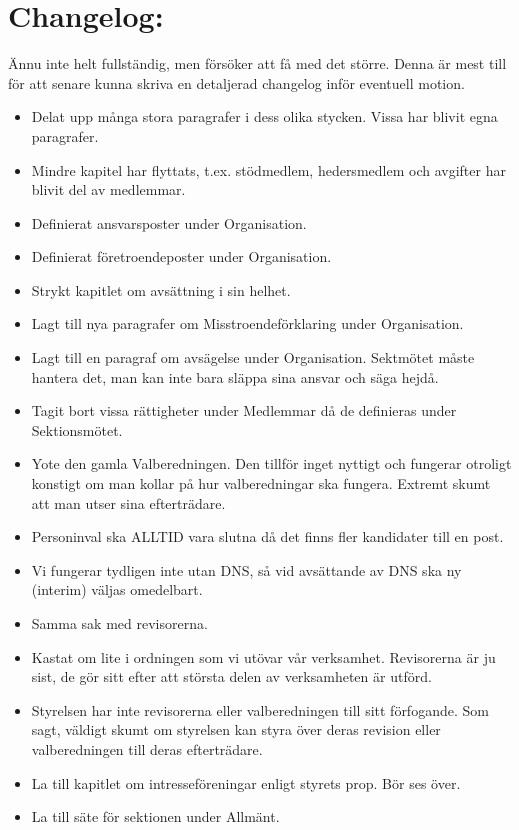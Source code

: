 \documentclass[a4paper]{dteklag}
\begin{document}
\section{Changelog:}
Ännu inte helt fullständig, men försöker att få med det större. Denna är mest till för att senare kunna skriva en detaljerad changelog inför eventuell motion.
\begin{itemize}
  \item Delat upp många stora paragrafer i dess olika stycken. Vissa har blivit egna paragrafer.
  \item Mindre kapitel har flyttats, t.ex. stödmedlem, hedersmedlem och avgifter har blivit del av medlemmar.
  \item Definierat ansvarsposter under Organisation.
  \item Definierat företroendeposter under Organisation.
  \item Strykt kapitlet om avsättning i sin helhet.
  \item Lagt till nya paragrafer om Misstroendeförklaring under Organisation.
  \item Lagt till en paragraf om avsägelse under Organisation. Sektmötet måste hantera det, man kan inte bara släppa sina ansvar och säga hejdå.
  \item Tagit bort vissa rättigheter under Medlemmar då de definieras under Sektionsmötet.
  \item Yote den gamla Valberedningen. Den tillför inget nyttigt och fungerar otroligt konstigt om man kollar på hur valberedningar ska fungera. Extremt skumt att man utser sina efterträdare.
  \item Personinval ska ALLTID vara slutna då det finns fler kandidater till en post.
  \item Vi fungerar tydligen inte utan DNS, så vid avsättande av DNS ska ny (interim) väljas omedelbart.
  \item Samma sak med revisorerna.
  \item Kastat om lite i ordningen som vi utövar vår verksamhet. Revisorerna är ju sist, de gör sitt efter att största delen av verksamheten är utförd.
  \item Styrelsen har inte revisorerna eller valberedningen till sitt förfogande. Som sagt, väldigt skumt om styrelsen kan styra över deras revision eller valberedningen till deras efterträdare.
  \item La till kapitlet om intresseföreningar enligt styrets prop. Bör ses över.
  \item La till säte för sektionen under Allmänt.

\end{itemize}
\end{document}
